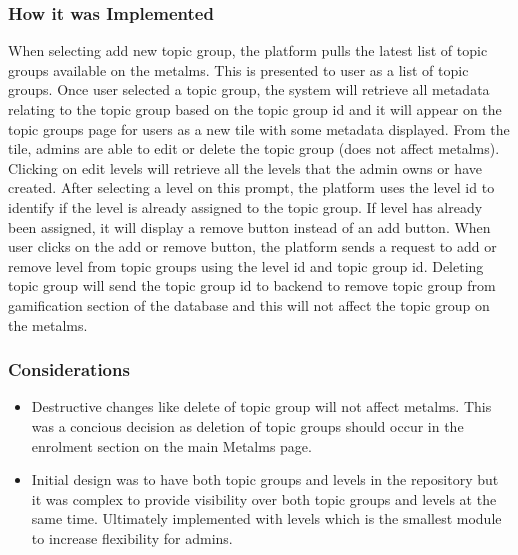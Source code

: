 \subsubsection{How it was Implemented}
When selecting add new topic group, the platform pulls the latest list of topic groups available on the metalms. This is presented to user as a list of topic groups. Once user selected a topic group, the system will retrieve all metadata relating to the topic group based on the topic group id and it will appear on the topic groups page for users as a new tile with some metadata displayed. From the tile, admins are able to edit or delete the topic group (does not affect metalms). Clicking on edit levels will retrieve all the levels that the admin owns or have created. After selecting a level on this prompt, the platform uses the level id to identify if the level is already assigned to the topic group. If level has already been assigned, it will display a remove button instead of an add button. When user clicks on the add or remove button, the platform sends a request to add or remove level from topic groups using the level id and topic group id. Deleting topic group will send the topic group id to backend to remove topic group from gamification section of the database and this will not affect the topic group on the metalms. 

\subsubsection{Considerations}
\begin{itemize}
    \item Destructive changes like delete of topic group will not affect metalms. This was a concious decision as deletion of topic groups should occur in the enrolment section on the main Metalms page.
    \item Initial design was to have both topic groups and levels in the repository but it was complex to provide visibility over both topic groups and levels at the same time. Ultimately implemented with levels which is the smallest module to increase flexibility for admins.
\end{itemize}

\newpage